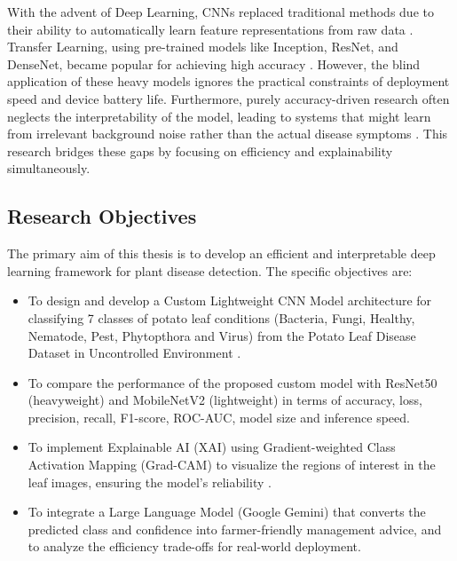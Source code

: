 With the advent of Deep Learning, CNNs replaced traditional methods due to their ability to automatically learn feature representations from raw data \cite{ngugi2021recent}. Transfer Learning, using pre-trained models like Inception, ResNet, and DenseNet, became popular for achieving high accuracy \cite{mohanty2016using, ferentinos2018deep}. However, the blind application of these heavy models ignores the practical constraints of deployment speed and device battery life. Furthermore, purely accuracy-driven research often neglects the interpretability of the model, leading to systems that might learn from irrelevant background noise rather than the actual disease symptoms \cite{amara2017deep}. This research bridges these gaps by focusing on efficiency and explainability simultaneously.

\subsection{Research Objectives}
The primary aim of this thesis is to develop an efficient and interpretable deep learning framework for plant disease detection. The specific objectives are:
\begin{itemize}
    \item To design and develop a Custom Lightweight CNN Model architecture for classifying 7 classes of potato leaf conditions (Bacteria, Fungi, Healthy, Nematode, Pest, Phytopthora and Virus) from the Potato Leaf Disease Dataset in Uncontrolled Environment \cite{shabrina2024novel}.
    \item To compare the performance of the proposed custom model with ResNet50 (heavyweight) and MobileNetV2 (lightweight) in terms of accuracy, loss, precision, recall, F1-score, ROC-AUC, model size and inference speed.
    \item To implement Explainable AI (XAI) using Gradient-weighted Class Activation Mapping (Grad-CAM) to visualize the regions of interest in the leaf images, ensuring the model's reliability \cite{selvaraju2017grad}.
    \item To integrate a Large Language Model (Google Gemini) that converts the predicted class and confidence into farmer-friendly management advice, and to analyze the efficiency trade-offs for real-world deployment.
\end{itemize}

